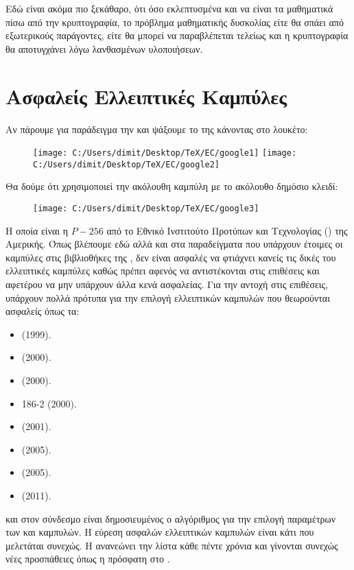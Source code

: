 \documentclass[oneside,a4paper]{article}
\begin{document}
Εδώ είναι ακόμα πιο ξεκάθαρο, ότι όσο εκλεπτυσμένα και να είναι τα μαθηματικά πίσω από την κρυπτογραφία, το πρόβλημα μαθηματικής δυσκολίας είτε θα σπάει από εξωτερικούς παράγοντες, είτε θα μπορεί να παραβλέπεται τελείως και η κρυπτογραφία θα αποτυγχάνει λόγω λανθασμένων υλοποιήσεων.



\pagebreak
\section{Ασφαλείς Ελλειπτικές Καμπύλες}

Αν πάρουμε για παράδειγμα την  και ψάξουμε το  της κάνοντας  στο λουκέτο:
\begin{figure}[H]
	\centering
	\texttt{[image: C:/Users/dimit/Desktop/TeX/EC/google1]}
	\texttt{[image: C:/Users/dimit/Desktop/TeX/EC/google2]}
\end{figure}
Θα δούμε ότι χρησιμοποιεί την ακόλουθη καμπύλη με το ακόλουθο δημόσιο κλειδί:
\begin{figure}[H]
	\centering
	\texttt{[image: C:/Users/dimit/Desktop/TeX/EC/google3]}
\end{figure}

Η οποία είναι η $P-256$ από το Εθνικό Ινστιτούτο Προτύπων και Τεχνολογίας () της Αμερικής. Όπως βλέπουμε εδώ αλλά και στα παραδείγματα που υπάρχουν έτοιμες οι καμπύλες στις βιβλιοθήκες της , δεν είναι ασφαλές να φτιάχνει κανείς τις δικές του ελλειπτικές καμπύλες καθώς πρέπει αφενός να αντιστέκονται στις επιθέσεις και αφετέρου να μην υπάρχουν άλλα κενά ασφαλείας. Για την αντοχή στις επιθέσεις, υπάρχουν πολλά πρότυπα για την επιλογή ελλειπτικών καμπυλών που θεωρούνται ασφαλείς όπως τα:
\begin{itemize}
	\item {} (1999).
	\item {} (2000).
	\item {} (2000).
	\item {} 186-2 (2000).
	\item {} (2001).
	\item {} (2005).
	\item {} (2005).
	\item {} (2011).
\end{itemize}
και στον σύνδεσμο  είναι δημοσιευμένος ο αλγόριθμος για την επιλογή παραμέτρων των  και  καμπυλών. Η εύρεση ασφαλών ελλειπτικών καμπυλών είναι κάτι που μελετάται συνεχώς. Η  ανανεώνει την λίστα  κάθε πέντε χρόνια  και γίνονται συνεχώς νέες προσπάθειες όπως η πρόσφατη στο \cite{lenstra}.
\end{document}

